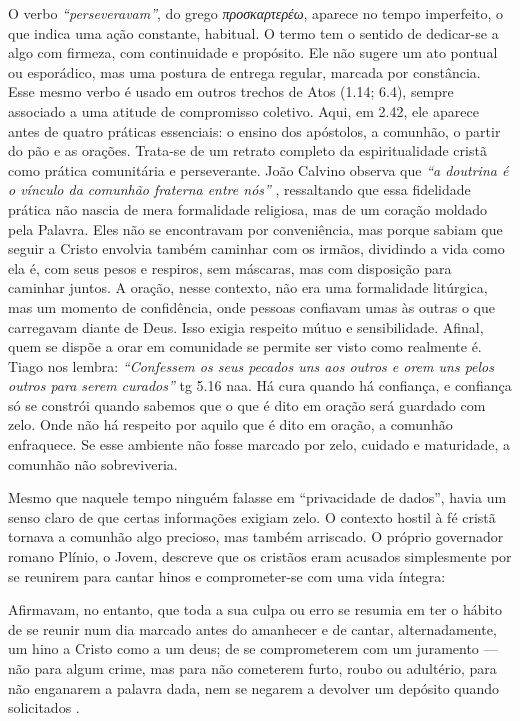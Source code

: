 O verbo \textit{``perseveravam''}, do grego \textit{\foreignlanguage{greek}{προσκαρτερέω}}, aparece no tempo imperfeito, o que indica uma ação constante, habitual. O termo tem o sentido de dedicar-se a algo com firmeza, com continuidade e propósito. Ele não sugere um ato pontual ou esporádico, mas uma postura de entrega regular, marcada por constância. Esse mesmo verbo é usado em outros trechos de Atos (1.14; 6.4), sempre associado a uma atitude de compromisso coletivo. Aqui, em 2.42, ele aparece antes de quatro práticas essenciais: o ensino dos apóstolos, a comunhão, o partir do pão e as orações. Trata-se de um retrato completo da espiritualidade cristã como prática comunitária e perseverante. João Calvino observa que \textit{``a doutrina é o vínculo da comunhão fraterna entre nós''} \cite{calvinoAtos2}, ressaltando que essa fidelidade prática não nascia de mera formalidade religiosa, mas de um coração moldado pela Palavra. Eles não se encontravam por conveniência, mas porque sabiam que seguir a Cristo envolvia também caminhar com os irmãos, dividindo a vida como ela é, com seus pesos e respiros, sem máscaras, mas com disposição para caminhar juntos. A oração, nesse contexto, não era uma formalidade litúrgica, mas um momento de confidência, onde pessoas confiavam umas às outras o que carregavam diante de Deus. Isso exigia respeito mútuo e sensibilidade. Afinal, quem se dispõe a orar em comunidade se permite ser visto como realmente é. Tiago nos lembra: \textit{``Confessem os seus pecados uns aos outros e orem uns pelos outros para serem curados''} \gls{tg} 5.16 \gls{naa}. Há cura quando há confiança, e confiança só se constrói quando sabemos que o que é dito em oração será guardado com zelo. Onde não há respeito por aquilo que é dito em oração, a comunhão enfraquece. Se esse ambiente não fosse marcado por zelo, cuidado e maturidade, a comunhão não sobreviveria.

Mesmo que naquele tempo ninguém falasse em “privacidade de dados”, havia um senso claro de que certas informações exigiam zelo. O contexto hostil à fé cristã tornava a comunhão algo precioso, mas também arriscado. O próprio governador romano Plínio, o Jovem, descreve que os cristãos eram acusados simplesmente por se reunirem para cantar hinos e comprometer-se com uma vida íntegra:

\begin{citacao}
    Afirmavam, no entanto, que toda a sua culpa ou erro se resumia em ter o hábito de se reunir num dia marcado antes do amanhecer e de cantar, alternadamente, um hino a Cristo como a um deus; de se comprometerem com um juramento — não para algum crime, mas para não cometerem furto, roubo ou adultério, para não enganarem a palavra dada, nem se negarem a devolver um depósito quando solicitados \cite[p. 272]{plinioCartasX}.
\end{citacao}

